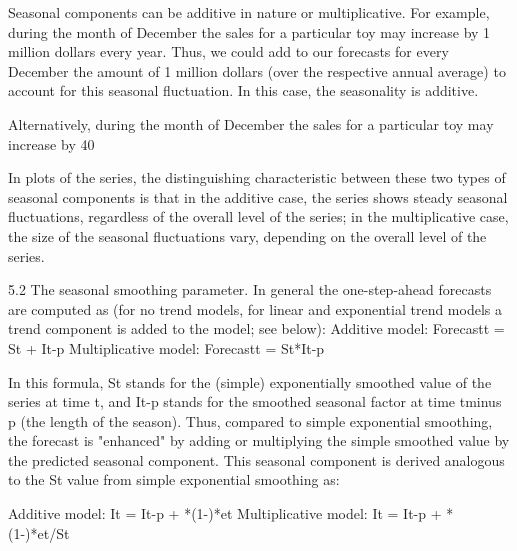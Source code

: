 Seasonal components can be additive in nature or multiplicative. For example, during the month of December the sales for a particular toy may increase by 1 million dollars every year. Thus, we could add to our forecasts for every December the amount of 1 million dollars (over the respective annual average) to account for this seasonal fluctuation. In this case, the seasonality is additive.

Alternatively, during the month of December the sales for a particular toy may increase by 40%

In plots of the series, the distinguishing characteristic between these two types of seasonal components is that in the additive case, the series shows steady seasonal fluctuations, regardless of the overall level of the series; in the multiplicative case, the size of the seasonal fluctuations vary, depending on the overall level of the series.


5.2 The seasonal smoothing parameter. In general the one-step-ahead forecasts are computed as (for no trend models, for linear and exponential trend models a trend component is added to the model; see below):
Additive model:
Forecastt = St + It-p
Multiplicative model:
Forecastt = St*It-p

In this formula, St stands for the (simple) exponentially smoothed value of the series at time t, and It-p stands for the smoothed seasonal factor at time tminus p (the length of the season). Thus, compared to simple exponential smoothing, the forecast is "enhanced" by adding or multiplying the simple smoothed value by the predicted seasonal component. This seasonal component is derived analogous to the St value from simple exponential smoothing as:

Additive model:
It = It-p + *(1-)*et
Multiplicative model:
It = It-p + *(1-)*et/St

